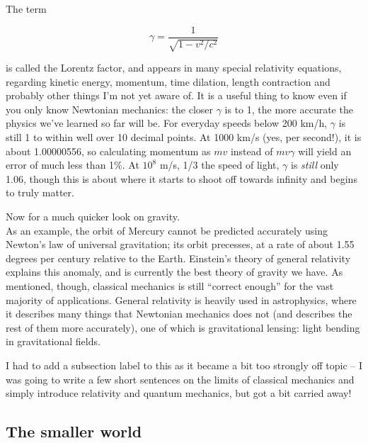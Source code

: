\documentclass[8.01x]{subfiles}
\begin{document}
The term

\begin{equation}
\gamma = \frac{1}{\sqrt{1 - v^2/c^2}}
\end{equation}

is called the Lorentz factor, and appears in many special relativity equations, regarding kinetic energy, momentum, time dilation, length contraction and probably other things I'm not yet aware of. It is a useful thing to know even if you only know Newtonian mechanics: the closer $\gamma$ is to 1, the more accurate the physics we've learned so far will be. For everyday speeds below 200 km/h, $\gamma$ is still 1 to within well over 10 decimal points. At 1000 km/s (yes, per second!), it is about 1.00000556, so calculating momentum as $m v$ instead of $m v \gamma$ will yield an error of much less than 1\%. At $10^8$ m/s, 1/3 the speed of light, $\gamma$ is \emph{still} only 1.06, though this is about where it starts to shoot off towards infinity and begins to truly matter.

Now for a much quicker look on gravity.\\
As an example, the orbit of Mercury cannot be predicted accurately using Newton's law of universal gravitation; its orbit precesses, at a rate of about 1.55 degrees per century relative to the Earth. Einstein's theory of general relativity explains this anomaly, and is currently the best theory of gravity we have. As mentioned, though, classical mechanics is still ``correct enough'' for the vast majority of applications. General relativity is heavily used in astrophysics, where it describes many things that Newtonian mechanics does not (and describes the rest of them more accurately), one of which is gravitational lensing: light bending in gravitational fields.

I had to add a subsection label to this as it became a bit too strongly off topic -- I was going to write a few short sentences on the limits of classical mechanics and simply introduce relativity and quantum mechanics, but got a bit carried away!

\subsection{The smaller world}
\end{document}
